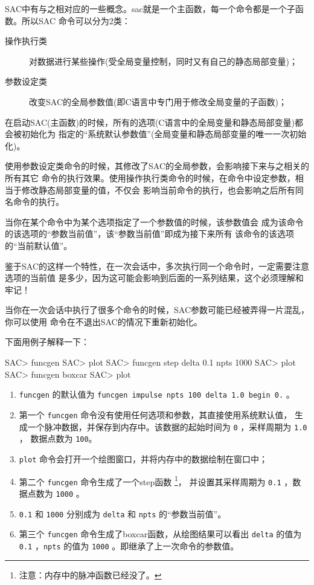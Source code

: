 SAC中有与之相对应的一些概念。sac就是一个主函数，每一个命令都是一个子函数。所以SAC
命令可以分为2类：
\begin{description}
\item[操作执行类] 对数据进行某些操作(受全局变量控制，同时又有自己的静态局部变量)；
\item[参数设定类] 改变SAC的全局参数值(即C语言中专门用于修改全局变量的子函数)；
\end{description}

在启动SAC(主函数)的时候，所有的选项(C语言中的全局变量和静态局部变量)都会被初始化为
指定的``系统默认参数值''(全局变量和静态局部变量的唯一一次初始化)。

使用参数设定类命令的时候，其修改了SAC的全局参数，会影响接下来与之相关的所有其它
命令的执行效果。使用操作执行类命令的时候，在命令中设定参数，相当于修改静态局部变量的值，不仅会
影响当前命令的执行，也会影响之后所有同名命令的执行。

当你在某个命令中为某个选项指定了一个参数值的时候，该参数值会
成为该命令的该选项的``参数当前值''，该``参数当前值''即成为接下来所有
该命令的该选项的``当前默认值''。

鉴于SAC的这样一个特性，在一次会话中，多次执行同一个命令时，一定需要注意选项的当前值
是多少，因为这可能会影响到后面的一系列结果，这个必须理解和牢记！

\begin{note}
当你在一次会话中执行了很多个命令的时候，SAC参数可能已经被弄得一片混乱，
你可以使用  命令在不退出SAC的情况下重新初始化。
\end{note}

下面用例子解释一下：
\begin{SACCode}
SAC> funcgen
SAC> plot
SAC> funcgen step delta 0.1 npts 1000
SAC> plot
SAC> funcgen boxcar
SAC> plot
\end{SACCode}

\begin{enumerate}
\item \texttt{funcgen} 的默认值为 \texttt{funcgen impulse npts 100 delta 1.0 begin 0.} 。
\item 第一个 \texttt{funcgen} 命令没有使用任何选项和参数，其直接使用系统默认值，
    生成一个脉冲数据，并保存到内存中。该数据的起始时间为 \texttt{0} ，采样周期为 \texttt{1.0} ，
    数据点数为 \texttt{100}。
\item \texttt{plot} 命令会打开一个绘图窗口，并将内存中的数据绘制在窗口中；
\item 第二个 \texttt{funcgen} 命令生成了一个step函数
    \footnote{注意：内存中的脉冲函数已经没了。}，
    并设置其采样周期为 \texttt{0.1} ，数据点数为 \texttt{1000} 。
\item \texttt{0.1} 和 \texttt{1000} 分别成为 \texttt{delta} 和 \texttt{npts} 的``参数当前值''。
\item 第三个 \texttt{funcgen} 命令生成了boxcar函数，从绘图结果可以看出 \texttt{delta} 的值为
    \texttt{0.1} ，\texttt{npts} 的值为 \texttt{1000} 。即继承了上一次命令的参数值。
\end{enumerate}

